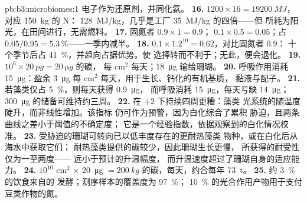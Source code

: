 \begin{solution}{pb:b3:microbiomes:1}
电子作为还原剂，并同化氨。
\textbf{16.} $1200\times 16 = \qty{19200}{MJ}$，对应 \qty{150}{kg} 的 N：
\qty{128}{MJ/kg}，几乎是工厂 \qty{35}{MJ/kg} 的四倍——但
所耗为阳光，在田间进行，无需燃料。
\textbf{17.} 固氮者 $0.9\times 1 = 0.9$； $0.1\times 0.5 =
0.05$；占 $0.05/0.95 = 5.3\,\%$——一季内减半。
\textbf{18.}  $0.1\times 1.2^{10} = 0.62$，对比固氮者 $0.9$：
十个季节后占 \qty{41}{\%}，并趋向占据优势。使
选择转而不利于；无此，便会退化。
\textbf{19.} $10^{6}\times \qty{20}{pg} = \qty{20}{\micro g}$ 的碳，
每 cm$^{2}$ 每天；\qty{18}{\micro g} 输给珊瑚。
\textbf{20.} 呼吸作用消耗 \qty{15}{\micro g}：盈余 \qty{3}{\micro g}
每 cm$^{2}$ 每天，用于生长、钙化的有机基质，
黏液与配子。
\textbf{21.} 若藻类仅占 \qty{5}{\%}，则每天获得 \qty{0.9}{\micro g}，
而呼吸消耗 \qty{15}{\micro g}，每天亏缺 \qty{14}{\micro g}；
\qty{300}{\micro g} 的储备可维持约三周。
\textbf{22.} 在 $+2$ 下持续四周更糟：藻类
光系统的随温度陡升，而非线性增加。该指标
仍可作为预警，因为白化综合了累积
胁迫，且两条曲线之差小于阈值的不确定度；
它是一个经验指数，依据观察到的白化情况校准。
\textbf{23.} 受胁迫的珊瑚可转向已以低丰度存在的更耐热藻类
物种，或在白化后从海水中获取它们；
耐热藻类提供的碳较少，因此珊瑚生长更慢，
所获得的耐受性仅为一至两度——
远小于预计的升温幅度，
而升温速度超过了珊瑚自身的适应能力。
\textbf{24.} $10^{10}$ cm$^{2}$ $\times$ \qty{20}{\micro g} $=
\qty{200}{kg}$ 的碳，每天，约合每年 \qty{73}{t}。
\textbf{25.} 约 \qty{3}{\%} 的饮食来自的
发酵；测序样本的覆盖度为 \qty{97}{\%}；
\qty{10}{\%} 的光合作用产物用于支付豆类作物的氮。
\end{solution}
